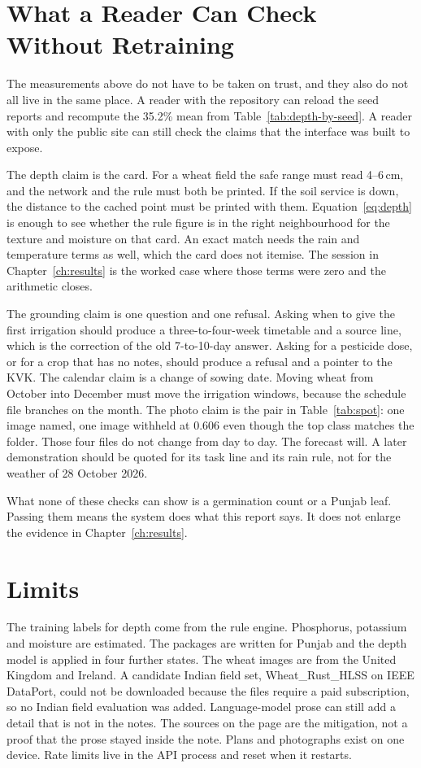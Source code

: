 \section{What a Reader Can Check Without Retraining}
The measurements above do not have to be taken on trust, and they also do not all live in the same place. A reader with the repository can reload the seed reports and recompute the 35.2\% mean from Table~\ref{tab:depth-by-seed}. A reader with only the public site can still check the claims that the interface was built to expose.

The depth claim is the card. For a wheat field the safe range must read 4--6\,cm, and the network and the rule must both be printed. If the soil service is down, the distance to the cached point must be printed with them. Equation~\eqref{eq:depth} is enough to see whether the rule figure is in the right neighbourhood for the texture and moisture on that card. An exact match needs the rain and temperature terms as well, which the card does not itemise. The session in Chapter~\ref{ch:results} is the worked case where those terms were zero and the arithmetic closes.

The grounding claim is one question and one refusal. Asking when to give the first irrigation should produce a three-to-four-week timetable and a source line, which is the correction of the old 7-to-10-day answer. Asking for a pesticide dose, or for a crop that has no notes, should produce a refusal and a pointer to the KVK. The calendar claim is a change of sowing date. Moving wheat from October into December must move the irrigation windows, because the schedule file branches on the month. The photo claim is the pair in Table~\ref{tab:spot}: one image named, one image withheld at 0.606 even though the top class matches the folder. Those four files do not change from day to day. The forecast will. A later demonstration should be quoted for its task line and its rain rule, not for the weather of 28 October 2026.

What none of these checks can show is a germination count or a Punjab leaf. Passing them means the system does what this report says. It does not enlarge the evidence in Chapter~\ref{ch:results}.

\section{Limits}
The training labels for depth come from the rule engine. Phosphorus, potassium and moisture are estimated. The packages are written for Punjab and the depth model is applied in four further states. The wheat images are from the United Kingdom and Ireland. A candidate Indian field set, Wheat\_Rust\_HLSS on IEEE DataPort, could not be downloaded because the files require a paid subscription, so no Indian field evaluation was added. Language-model prose can still add a detail that is not in the notes. The sources on the page are the mitigation, not a proof that the prose stayed inside the note. Plans and photographs exist on one device. Rate limits live in the API process and reset when it restarts.

